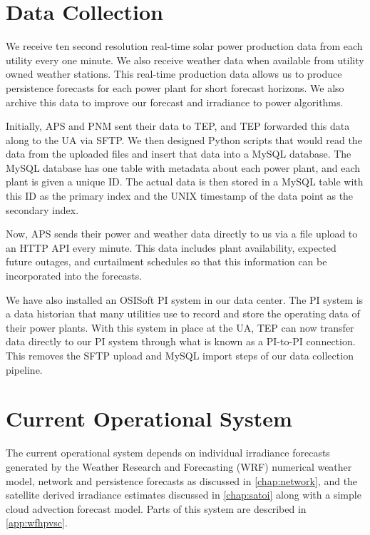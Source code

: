 \section{Data Collection}
\label{sec:datacollection}

We receive ten second resolution real-time solar power production data
from each utility every one minute.
We also receive weather data when available from utility owned weather
stations.
This real-time production data allows us to produce persistence
forecasts for each power plant for short forecast horizons.
We also archive this data to improve our forecast and irradiance to
power algorithms.

Initially, APS and PNM sent their data to TEP, and TEP forwarded this
data along to the UA via SFTP.
We then designed Python scripts that would read the data from the
uploaded files and insert that data into a MySQL database.
The MySQL database has one table with metadata about each power plant,
and each plant is given a unique ID.
The actual data is then stored in a MySQL table with this ID as the
primary index and the UNIX timestamp of the data point as the secondary
index.

Now, APS sends their power and weather data directly to us via a file
upload to an HTTP API every minute.
This data includes plant availability, expected future outages, and
curtailment schedules so that this information can be incorporated
into the forecasts.

We have also installed an OSISoft PI system in our data center.
The PI system is a data historian that many utilities use to record
and store the operating data of their power plants.
With this system in place at the UA, TEP can now transfer data
directly to our PI system through what is known as a PI-to-PI
connection.
This removes the SFTP upload and MySQL import steps of our data
collection pipeline.

\section{Current Operational System}
\label{sec:opsys}

The current operational system depends on individual irradiance forecasts
generated by the Weather Research and Forecasting (WRF) numerical
weather model, network and persistence forecasts as discussed in
\cref{chap:network}, and the satellite derived irradiance estimates
discussed in \cref{chap:satoi} along with a simple cloud advection
forecast model.
Parts of this system are described in \cref{app:wfhpvsc}.


